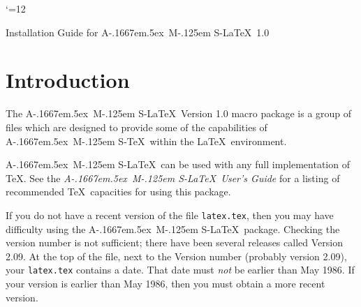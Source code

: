 \textheight 46pc
\textwidth 30.5pc
\def\thesection {\arabic{section}}

\newcommand{\amstex}{{\the\textfont2 A}\kern-.1667em\lower.5ex\hbox
 {\the\textfont2 M}\kern-.125em{\the\textfont2 S}-\TeX}
\newcommand{\amslatex}{{\the\textfont2 A}\kern-.1667em\lower.5ex\hbox
 {\the\textfont2 M}\kern-.125em{\the\textfont2 S}-\LaTeX}

\newcommand{\usertype}[1]{\vspace{3pt plus 3pt}\centerline{%
                                #1}\vspace{3pt plus 3pt}}

{\catcode`\@=12
\gdef\atsign/{@}}



\centerline{\huge Installation Guide for \amslatex\ 1.0}
\vspace{-8pt}

\section{Introduction}

The \amslatex\ Version 1.0 macro package is a group of files which are 
designed to provide some of the capabilities of \amstex\ within the 
\LaTeX\ environment.

\amslatex\ can be used with any full implementation of \TeX. See the {\it
\amslatex\ User's Guide}
for a listing of recommended \TeX\ capacities for using this package.

If you do not have a recent version of the file \verb+latex.tex+, then you 
may have difficulty using the \amslatex\ package. Checking the version
number is not sufficient; there have been several releases called Version 2.09.
At the top of the file, next to the Version number (probably version 2.09),
your \verb+latex.tex+ contains a date. That date must {\it not} be earlier than
May 1986.
If your version is earlier than May 1986, then you must obtain a more
recent version.

